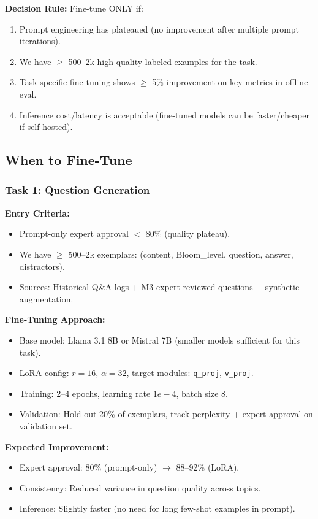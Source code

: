 \documentclass[11pt,letterpaper]{article}
\begin{document}
\textbf{Decision Rule:} Fine-tune ONLY if:
\begin{enumerate}
\item Prompt engineering has plateaued (no improvement after multiple prompt iterations).
\item We have $\geq$ 500--2k high-quality labeled examples for the task.
\item Task-specific fine-tuning shows $\geq$ 5\% improvement on key metrics in offline eval.
\item Inference cost/latency is acceptable (fine-tuned models can be faster/cheaper if self-hosted).
\end{enumerate}

\subsection{When to Fine-Tune}\label{subsec:when-to-finetune}

\subsubsection{Task 1: Question Generation}

\textbf{Entry Criteria:}
\begin{itemize}
\item Prompt-only expert approval $<$ 80\% (quality plateau).
\item We have $\geq$ 500--2k exemplars: (content, Bloom\_level, question, answer, distractors).
\item Sources: Historical Q\&A logs + M3 expert-reviewed questions + synthetic augmentation.
\end{itemize}

\textbf{Fine-Tuning Approach:}
\begin{itemize}
\item Base model: Llama 3.1 8B or Mistral 7B (smaller models sufficient for this task).
\item LoRA config: $r=16$, $\alpha=32$, target modules: \texttt{q\_proj}, \texttt{v\_proj}.
\item Training: 2--4 epochs, learning rate $1e-4$, batch size 8.
\item Validation: Hold out 20\% of exemplars, track perplexity + expert approval on validation set.
\end{itemize}

\textbf{Expected Improvement:}
\begin{itemize}
\item Expert approval: 80\% (prompt-only) $\rightarrow$ 88--92\% (LoRA).
\item Consistency: Reduced variance in question quality across topics.
\item Inference: Slightly faster (no need for long few-shot examples in prompt).
\end{itemize}
\end{document}
